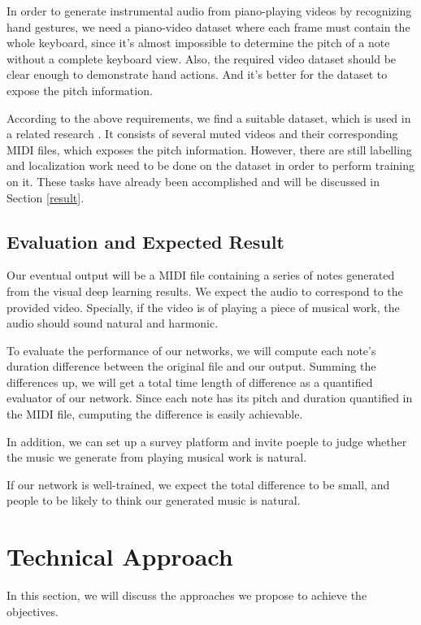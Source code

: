 \documentclass[10pt,twocolumn,letterpaper]{article}
\begin{document}
In order to generate instrumental audio from piano-playing videos by recognizing hand gestures, we need a piano-video dataset where each frame must contain the whole keyboard, since it's almost impossible to determine the pitch of a note without a complete keyboard view.
Also, the required video dataset should be clear enough to demonstrate hand actions. And it's better for the dataset to expose the pitch information.

According to the above requirements, we find a suitable dataset, which is used in a related research \cite{Akbari}. It consists of several muted videos and their corresponding MIDI files, which exposes the pitch information.
However, there are still labelling and localization work need to be done on the dataset in order to perform training on it. These tasks have already been accomplished and will be discussed in Section \ref{result}.

\subsection{Evaluation and Expected Result}

Our eventual output will be a MIDI file containing a series of notes generated from the visual deep learning results. We expect the audio to correspond to the provided video. Specially, if the video is of playing a piece of musical work, the audio should sound natural and harmonic.

To evaluate the performance of our networks, we will compute each note's duration difference between the original file and our output. Summing the differences up, we will get a total time length of difference as a quantified evaluator of our network. Since each note has its pitch and duration quantified in the MIDI file, cumputing the difference is easily achievable.

In addition, we can set up a survey platform and invite poeple to judge whether the music we generate from playing musical work is natural.

If our network is well-trained, we expect the total difference to be small, and people to be likely to think our generated music is natural.

\section{Technical Approach}

In this section, we will discuss the approaches we propose to achieve the objectives.
\end{document}
